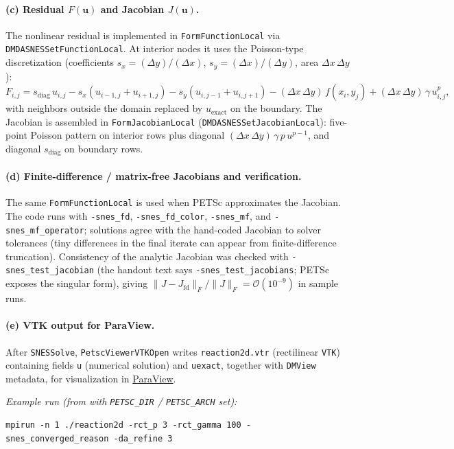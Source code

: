 \documentclass[11pt]{article}
\begin{document}
\paragraph{(c) Residual $F(\mathbf{u})$ and Jacobian $J(\mathbf{u})$.}
The nonlinear residual is implemented in \texttt{FormFunctionLocal} via \texttt{DMDASNESSetFunctionLocal}. At interior nodes it uses the Poisson-type discretization (coefficients $s_x=(\Delta y)/(\Delta x)$, $s_y=(\Delta x)/(\Delta y)$, area $\Delta x\,\Delta y$):
\[
  F_{i,j} = s_{\mathrm{diag}}\,u_{i,j} - s_x(u_{i-1,j}+u_{i+1,j}) - s_y(u_{i,j-1}+u_{i,j+1})
            - (\Delta x\,\Delta y)\,f(x_i,y_j)
            + (\Delta x\,\Delta y)\,\gamma\,u_{i,j}^{p},
\]
with neighbors outside the domain replaced by $u_{\mathrm{exact}}$ on the boundary. The Jacobian is assembled in \texttt{FormJacobianLocal} (\texttt{DMDASNESSetJacobianLocal}): five-point Poisson pattern on interior rows plus diagonal $(\Delta x\,\Delta y)\,\gamma\,p\,u^{p-1}$, and diagonal $s_{\mathrm{diag}}$ on boundary rows.

\paragraph{(d) Finite-difference / matrix-free Jacobians and verification.}
The same \texttt{FormFunctionLocal} is used when PETSc approximates the Jacobian. The code runs with \texttt{-snes\_fd}, \texttt{-snes\_fd\_color}, \texttt{-snes\_mf}, and \texttt{-snes\_mf\_operator}; solutions agree with the hand-coded Jacobian to solver tolerances (tiny differences in the final iterate can appear from finite-difference truncation). Consistency of the analytic Jacobian was checked with \texttt{-snes\_test\_jacobian} (the handout text says \texttt{-snes\_test\_jacobians}; PETSc exposes the singular form), giving $\|J-J_{\mathrm{fd}}\|_F/\|J\|_F=\mathcal{O}(10^{-9})$ in sample runs.

\paragraph{(e) VTK output for ParaView.}
After \texttt{SNESSolve}, \texttt{PetscViewerVTKOpen} writes \texttt{reaction2d.vtr} (rectilinear \texttt{VTK}) containing fields \texttt{u} (numerical solution) and \texttt{uexact}, together with \texttt{DMView} metadata, for visualization in \href{https://www.paraview.org/}{ParaView}.

\smallskip
\noindent\textit{Example run (from  with \texttt{PETSC\_DIR} / \texttt{PETSC\_ARCH} set):}
\begin{verbatim}
mpirun -n 1 ./reaction2d -rct_p 3 -rct_gamma 100 -snes_converged_reason -da_refine 3
\end{verbatim}
\end{document}
